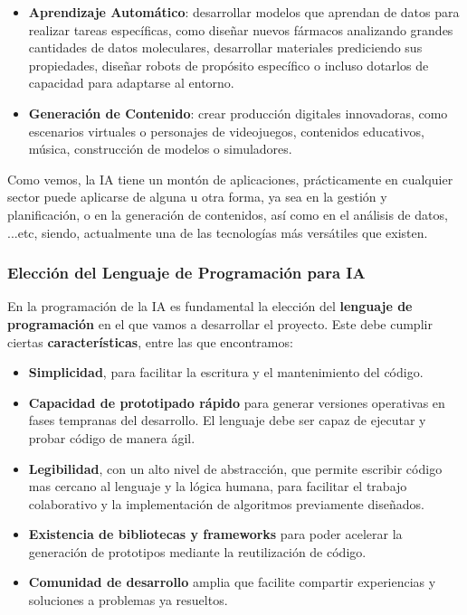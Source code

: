 \begin{itemize}
	\item \textbf{Aprendizaje Automático}: desarrollar modelos que aprendan de datos para realizar tareas específicas, como diseñar nuevos fármacos analizando grandes cantidades de datos moleculares, desarrollar materiales prediciendo sus propiedades, diseñar robots de propósito específico o incluso dotarlos de capacidad para adaptarse al entorno.
	\item \textbf{Generación de Contenido}: crear producción digitales innovadoras, como escenarios virtuales o personajes de videojuegos, contenidos educativos, música, construcción de modelos o simuladores.
\end{itemize}

Como vemos, la IA tiene un montón de aplicaciones, prácticamente en cualquier sector puede aplicarse de alguna u otra forma, ya sea en la gestión y planificación, o en la generación de contenidos, así como en el análisis de datos, ...etc, siendo, actualmente una de las tecnologías más versátiles que existen.

\subsubsection{Elección del Lenguaje de Programación para IA}
En la programación de la IA es fundamental la elección del \textbf{lenguaje de programación} en el que vamos a desarrollar el proyecto. Este debe cumplir ciertas \textbf{características}, entre las que encontramos:
\begin{itemize}
	\item \textbf{Simplicidad}, para facilitar la escritura y el mantenimiento del código.
	\item \textbf{Capacidad de prototipado rápido} para generar versiones operativas en fases tempranas del desarrollo. El lenguaje debe ser capaz de ejecutar y probar código de manera ágil. 
	\item \textbf{Legibilidad}, con un alto nivel de abstracción, que permite escribir código mas cercano al lenguaje y la lógica humana, para facilitar el trabajo colaborativo y la implementación de algoritmos previamente diseñados.
	\item \textbf{Existencia de bibliotecas y frameworks} para poder acelerar la generación de prototipos mediante la reutilización de código.
	\item \textbf{Comunidad de desarrollo} amplia que facilite compartir experiencias y soluciones a problemas ya resueltos.
\end{itemize}

